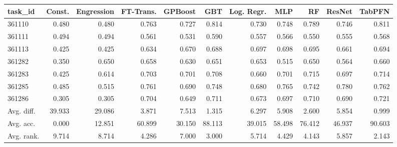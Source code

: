 \begin{tabular}{lrrrrrrrrrr}
\toprule
task\_id & Const. & Engression & FT-Trans. & GPBoost & GBT & Log. Regr. & MLP & RF & ResNet & TabPFN \\
\midrule
361110 & 0.480 & 0.480 & 0.763 & 0.727 & 0.814 & 0.730 & 0.748 & 0.789 & 0.746 & 0.811 \\
361111 & 0.494 & 0.494 & 0.561 & 0.531 & 0.590 & 0.557 & 0.566 & 0.550 & 0.555 & 0.568 \\
361113 & 0.425 & 0.425 & 0.634 & 0.670 & 0.688 & 0.697 & 0.698 & 0.695 & 0.661 & 0.694 \\
361282 & 0.350 & 0.650 & 0.658 & 0.630 & 0.651 & 0.653 & 0.515 & 0.650 & 0.564 & 0.660 \\
361283 & 0.425 & 0.614 & 0.703 & 0.701 & 0.708 & 0.660 & 0.701 & 0.715 & 0.697 & 0.714 \\
361285 & 0.485 & 0.515 & 0.761 & 0.690 & 0.748 & 0.680 & 0.765 & 0.742 & 0.780 & 0.762 \\
361286 & 0.305 & 0.305 & 0.704 & 0.649 & 0.711 & 0.673 & 0.697 & 0.710 & 0.690 & 0.721 \\
Avg. diff. & 39.933 & 29.086 & 3.871 & 7.513 & 1.315 & 6.297 & 5.908 & 2.600 & 5.854 & 0.999 \\
Avg. acc. & 0.000 & 12.851 & 60.899 & 30.150 & 88.113 & 39.015 & 58.498 & 76.412 & 46.937 & 90.603 \\
Avg. rank. & 9.714 & 8.714 & 4.286 & 7.000 & 3.000 & 5.714 & 4.429 & 4.143 & 5.857 & 2.143 \\
\bottomrule
\end{tabular}
